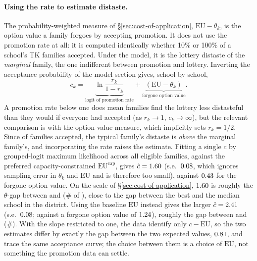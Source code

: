 \documentclass{article}
\begin{document}
\paragraph{Using the rate to estimate distaste.} The probability-weighted measure of \S\ref{sec:cost-of-application}, $\mathrm{EU} - \theta_k$, is the option value a family forgoes by accepting promotion. It does not use the promotion rate at all: it is computed identically whether 10\% or 100\% of a school's TK families accepted. Under the model, it is the lottery distaste of the \emph{marginal} family, the one indifferent between promotion and lottery. Inverting the acceptance probability of the model section gives, school by school,
\[
c_k = \underbrace{\ln \frac{r_k}{1 - r_k}}_{\text{logit of promotion rate}} + \underbrace{\left( \mathrm{EU} - \theta_k \right)}_{\text{forgone option value}} .
\]
A promotion rate below one does mean families find the lottery less distasteful than they would if everyone had accepted (as $r_k \to 1$, $c_k \to \infty$), but the relevant comparison is with the option-value measure, which implicitly sets $r_k = 1/2$. Since \numTakeup{} of families accepted, the typical family's distaste is \emph{above} the marginal family's, and incorporating the rate raises the estimate. Fitting a single $c$ by grouped-logit maximum likelihood across all \numEligibleFamilies{} eligible families, against the preferred capacity-constrained $\mathrm{EU}^{\text{cap}}$, gives $\hat{c} = 1.60$ (s.e.\ $0.08$, which ignores sampling error in $\theta_k$ and $\mathrm{EU}$ and is therefore too small), against $0.43$ for the forgone option value. On the scale of \S\ref{sec:cost-of-application}, $1.60$ is roughly the $\theta$-gap between \numTopSchool{} and \numChatCapSchool{} (\#\numChatCapRank{} of \numSchools), close to the gap between the best and the median school in the district. Using the baseline $\mathrm{EU}$ instead gives the larger $\hat{c} = 2.41$ (s.e.\ $0.08$; against a forgone option value of $1.24$), roughly the gap between \numTopSchool{} and \numChatSchool{} (\#\numChatRank). With the slope restricted to one, the data identify only $c - \mathrm{EU}$, so the two estimates differ by exactly the gap between the two expected values, $0.81$, and trace the same acceptance curve; the choice between them is a choice of $\mathrm{EU}$, not something the promotion data can settle.
\end{document}
